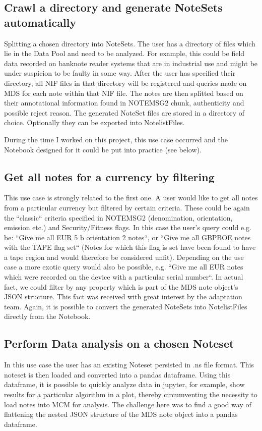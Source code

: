 \subsection{Crawl a directory and generate NoteSets automatically}
Splitting a chosen directory into NoteSets. The user has a directory of files which lie in the Data Pool and need to be analyzed. For example, this could be field data recorded on banknote reader systems that are in industrial use and might be under suspicion to be faulty in some way. After the user has specified their directory, all NIF files in that directory will be registered and queries made on MDS for each note within that NIF file. The notes are then splitted based on their annotational information found in NOTEMSG2 chunk, authenticity and possible reject reason. The generated NoteSet files are stored in a directory of choice. Optionally they can be exported into NotelistFiles.\par
During the time I worked on this project, this use case occurred and the Notebook designed for it could be put into practice (see below).
\subsection{Get all notes for a currency by filtering}
This use case is strongly related to the first one. A user would like to get all notes from a particular currency but filtered by certain criteria. These could be again the ``classic`` criteria specified in NOTEMSG2 (denomination, orientation, emission etc.) and Security/Fitness flags. In this case the user's query could e.g. be: ``Give me all EUR 5 b orientation 2 notes``, or ``Give me all GBPBOE notes with the TAPE flag set`` (Notes for which this flag is set have been found to have a tape region and would therefore be considered unfit). Depending on the use case a more exotic query would also be possible, e.g. ``Give me all EUR notes which were recorded on the device with a particular serial number``. In actual fact, we could filter by any property which is part of the MDS note object's JSON structure. This fact was received with great interest by the adaptation team. Again, it is possible to convert the generated NoteSets into NotelistFiles directly from the Notebook.
\subsection{Perform Data analysis on a chosen Noteset}
In this use case the user has an existing Noteset persisted in .ns file format. This noteset is then loaded and converted into a pandas dataframe. Using this dataframe, it is possible to quickly analyze data in jupyter, for example, show results for a particular algorithm in a plot, thereby circumventing the necessity to load notes into MCM for analysis. The challenge here was to find a good way of flattening the nested JSON structure of the MDS note object into a pandas dataframe. 
